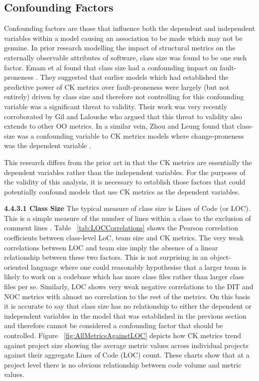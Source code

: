 \subsection{Confounding Factors}
Confounding factors are those that influence both the dependent and independent variables within a model causing an association to be made which may not be genuine. In prior research modelling the impact of structural metrics on the externally observable attributes of software, class size was found to be one such factor. Emam et al found that class size had a confounding impact on fault-proneness \citep{el2001prediction}. They suggested that earlier models which had established the predictive power of CK metrics over fault-proneness were largely (but not entirely) driven by class size and therefore not controlling for this confounding variable was a significant threat to validity. Their work was very recently corroborated by Gil and Lalouche \citep{gil2017correlation} who argued that this threat to validity also extends to other OO metrics. In a similar vein, Zhou and Leung found that class-size was a confounding variable to CK metrics models where change-proneness was the dependent variable \citep{zhou2006empirical}.

This research differs from the prior art in that the CK metrics are essentially the dependent variables rather than the independent variables. For the purposes of the validity of this analysis, it is necessary to establish those factors that could potentially confound models that use CK metrics as the dependent variables.

\newline
\textbf{4.4.3.1 Class Size}
\newline
The typical measure of class size is  Lines of Code (or LOC). This is a simple measure of the number of lines within a class to the exclusion of comment lines \citep{nguyen2007sloc}. Table ~\ref{tab:LOCCorrelations} shows the Pearson correlation coefficients between class-level LoC, team size and CK metrics.  The very weak correlations between LOC and team size imply the absence of a linear relationship between these two factors. This is not surprising in an object-oriented language where one could reasonably hypothesise that a larger team is likely to work on a codebase which has more class files rather than larger class files per se. Similarly, LOC shows very weak negative correlations to the DIT and NOC metrics with almost no correlation to the rest of the metrics. On this basis it is accurate to say that class size has no relationship to either the dependent or independent variables in the model that was established in the previous section and therefore cannot be considered a confounding factor that should be controlled. Figure ~\ref{fig:AllMetricsAgainstLOC}  depicts how CK metrics trend against project size showing the average metric values across individual projects against their aggregate Lines of Code (LOC) count. These charts show that at a project level there is no obvious relationship between code volume and metric values.


